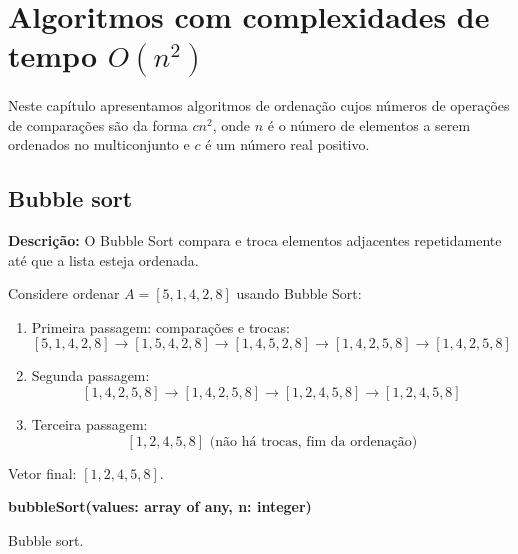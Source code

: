\chapter{Algoritmos com complexidades de tempo $O(n^2)$}

Neste capítulo apresentamos algoritmos de ordenação cujos números de operações de comparações são da forma $cn^2$, onde $n$ é o número de elementos a serem ordenados no multiconjunto e $c$ é um número real positivo.

\section{Bubble sort}
\textbf{Descrição:} O Bubble Sort compara e troca elementos adjacentes repetidamente até que a lista esteja ordenada.

\begin{exmp}
Considere ordenar $A = [5, 1, 4, 2, 8]$ usando Bubble Sort:

\begin{enumerate}
    \item Primeira passagem: comparações e trocas:
    \[
    [5,1,4,2,8] \rightarrow [1,5,4,2,8] \rightarrow [1,4,5,2,8] \rightarrow [1,4,2,5,8] \rightarrow [1,4,2,5,8]
    \]

    \item Segunda passagem:
    \[
    [1,4,2,5,8] \rightarrow [1,4,2,5,8] \rightarrow [1,2,4,5,8] \rightarrow [1,2,4,5,8]
    \]

    \item Terceira passagem:
    \[
    [1,2,4,5,8] \text{ (não há trocas, fim da ordenação)}
    \]

\end{enumerate}
Vetor final: $[1,2,4,5,8]$.
\end{exmp}

\begin{center}
\begin{minipage}{.9\linewidth}
\begin{algorithm}[H]
\DontPrintSemicolon
\textbf{bubbleSort(values: array of any, n: integer)}

\caption{Bubble sort.}
\label{lab:alg-bubbleSort}
\end{algorithm}
\end{minipage}
\end{center}

